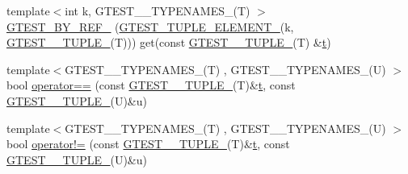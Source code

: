 \begin{DoxyCompactItemize}
\item 
{\footnotesize template$<$int k, G\+T\+E\+S\+T\+\_\+\_\+\+T\+Y\+P\+E\+N\+A\+M\+E\+S\+\_\+(\+T) $>$ }\\\mbox{\hyperlink{namespacestd_1_1tr1_ae7b5ea477ac34a3eef5c4c15c42b76ed}{G\+T\+E\+S\+T\+\_\+\+B\+Y\+\_\+\+R\+E\+F\+\_\+}} (\mbox{\hyperlink{gtest-tuple_8h_a1b7f133d8aa02e0b7afed7b66781eeb7}{G\+T\+E\+S\+T\+\_\+\+T\+U\+P\+L\+E\+\_\+\+E\+L\+E\+M\+E\+N\+T\+\_\+}}(k, \mbox{\hyperlink{namespacestd_1_1tr1_aa636d3269bf1f368a7bc09ff158bc482}{G\+T\+E\+S\+T\+\_\+\_\+\+T\+U\+P\+L\+E\+\_\+}}(T))) get(const \mbox{\hyperlink{namespacestd_1_1tr1_aa636d3269bf1f368a7bc09ff158bc482}{G\+T\+E\+S\+T\+\_\+\_\+\+T\+U\+P\+L\+E\+\_\+}}(T) \&\mbox{\hyperlink{_mutual_8h_a978d88b393c8a37dc2614c88788b3442}{t}})
\item 
{\footnotesize template$<$G\+T\+E\+S\+T\+\_\+\_\+\+T\+Y\+P\+E\+N\+A\+M\+E\+S\+\_\+(\+T) , G\+T\+E\+S\+T\+\_\+\_\+\+T\+Y\+P\+E\+N\+A\+M\+E\+S\+\_\+(\+U) $>$ }\\bool \mbox{\hyperlink{namespacestd_1_1tr1_af4516de784404381f9b14797694b6311}{operator==}} (const \mbox{\hyperlink{namespacestd_1_1tr1_aa636d3269bf1f368a7bc09ff158bc482}{G\+T\+E\+S\+T\+\_\+\_\+\+T\+U\+P\+L\+E\+\_\+}}(T)\&\mbox{\hyperlink{_mutual_8h_a978d88b393c8a37dc2614c88788b3442}{t}}, const \mbox{\hyperlink{namespacestd_1_1tr1_aa636d3269bf1f368a7bc09ff158bc482}{G\+T\+E\+S\+T\+\_\+\_\+\+T\+U\+P\+L\+E\+\_\+}}(U)\&u)
\item 
{\footnotesize template$<$G\+T\+E\+S\+T\+\_\+\_\+\+T\+Y\+P\+E\+N\+A\+M\+E\+S\+\_\+(\+T) , G\+T\+E\+S\+T\+\_\+\_\+\+T\+Y\+P\+E\+N\+A\+M\+E\+S\+\_\+(\+U) $>$ }\\bool \mbox{\hyperlink{namespacestd_1_1tr1_a058882c51de469b5e78d29076f864940}{operator!=}} (const \mbox{\hyperlink{namespacestd_1_1tr1_aa636d3269bf1f368a7bc09ff158bc482}{G\+T\+E\+S\+T\+\_\+\_\+\+T\+U\+P\+L\+E\+\_\+}}(T)\&\mbox{\hyperlink{_mutual_8h_a978d88b393c8a37dc2614c88788b3442}{t}}, const \mbox{\hyperlink{namespacestd_1_1tr1_aa636d3269bf1f368a7bc09ff158bc482}{G\+T\+E\+S\+T\+\_\+\_\+\+T\+U\+P\+L\+E\+\_\+}}(U)\&u)
\end{DoxyCompactItemize}
